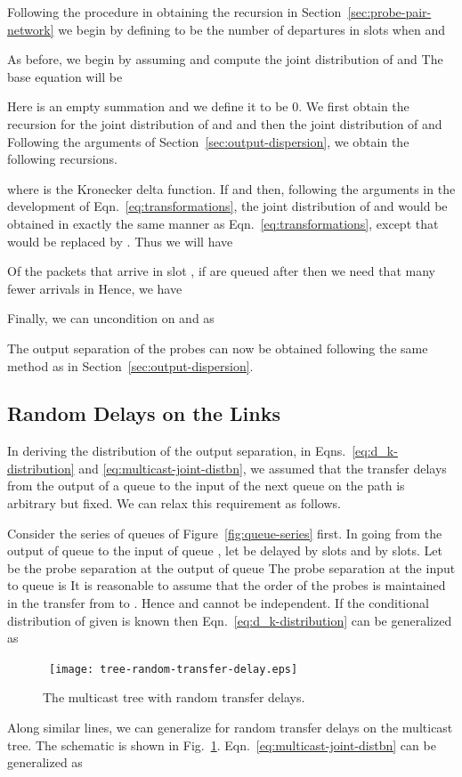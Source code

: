 \documentclass[11pt]{article}
\begin{document}
Following the procedure in obtaining the recursion in
Section~\ref{sec:probe-pair-network} we begin by defining
 to be the number of departures in slots 
when  and  

As before, we begin by assuming  and compute the joint
distribution of  and  The base
equation will be

Here  is an empty summation and we define it to be 0.  We
first obtain the recursion for the joint distribution of
 and  and then the joint distribution of
 and  Following the arguments of
Section~\ref{sec:output-dispersion}, we obtain the following
recursions.

where  is the Kronecker delta function. If  and
 then, following the arguments in the development of
Eqn.~\ref{eq:transformations}, the joint distribution of
 and  would be obtained in exactly
the same manner as Eqn.~\ref{eq:transformations}, except that 
would be replaced by .  Thus we will have

Of the  packets that arrive in slot , if  are queued
after  then we need that many fewer arrivals in 
Hence, we have

Finally, we can uncondition on  and  as


The output separation of the probes can now be obtained following the
same method as in Section~\ref{sec:output-dispersion}.

\subsection{Random Delays on the Links}
\label{sec:random-link-delays}
In deriving the distribution of the output separation, in
Eqns.~\ref{eq:d_k-distribution} and \ref{eq:multicast-joint-distbn},
we assumed that the transfer delays from the output of a queue to the
input of the next queue on the path is arbitrary but fixed. We can
relax this requirement as follows.

Consider the series of queues of Figure~\ref{fig:queue-series} first.
In going from the output of queue  to the input of queue , let
 be delayed by  slots and  by  slots. Let  be
the probe separation at the output of queue  The probe separation
at the input to queue  is  It
is reasonable to assume that the order of the probes is maintained in
the transfer from  to . Hence  and  cannot be
independent. If the conditional distribution of  given
 is known then Eqn.~\ref{eq:d_k-distribution} can be generalized
as 



\begin{figure}
  \begin{center}
    \
    \texttt{[image: tree-random-transfer-delay.eps]}
  \end{center}
  \caption{The multicast tree with random transfer delays. }
  \label{fig:tree-random-transfer-delay}
\end{figure}
Along similar lines, we can generalize for random transfer delays on
the multicast tree. The schematic is shown in
Fig.~\ref{fig:tree-random-transfer-delay}.
Eqn.~\ref{eq:multicast-joint-distbn} can be generalized as
\end{document}
